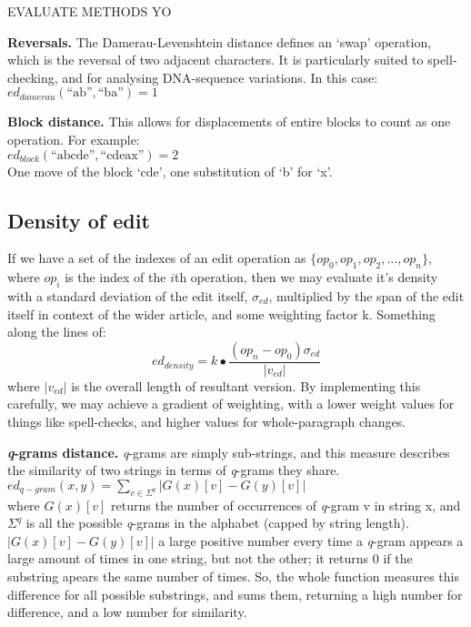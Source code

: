 EVALUATE METHODS YO \label{split-distance-eval}

\textbf{Reversals.} The Damerau-Levenshtein distance defines an `swap'
operation, which is the reversal of two adjacent characters. It is
particularly suited to spell-checking, and for analysing DNA-sequence
variations. In this case:\\ $ed_{damerau}(\text{``ab''},\text{``ba''})
= 1$

\textbf{Block distance.} This allows for displacements of entire
blocks to count as one operation. For
example:\\ $ed_{block}(\text{``abcde''},\text{``cdeax''})= 2$ \\ One
move of the block `cde', one substitution of `b' for
`x'.\cite{Tichy1984}

\subsection*{Density of edit}

If we have a set of the indexes of an edit operation as
$\{op_0,op_1,op_2,\dots, op_n\}$, where $op_i$ is the index of the
$i$th operation, then we may evaluate it's density with a standard
deviation of the edit itself, $\sigma_{ed}$, multiplied by the span of
the edit itself in context of the wider article, and some weighting
factor k. Something along the lines of:
$$ed_{density} = k\bullet\frac{(op_n - op_0)\sigma_{ed}}{|v_{ed}|}$$
where $|v_{ed}|$ is the overall length of resultant version. By
implementing this carefully, we may achieve a gradient of weighting,
with a lower weight values for things like spell-checks, and higher
values for whole-paragraph changes.

\textbf{\textit{q}-grams distance.} \textit{q}-grams are simply
sub-strings, and this measure describes the similarity of two strings
in terms of \textit{q}-grams they
share.\cite{Ukkonen1992}\\ $ed_{q-gram}(x,y)=\sum\limits_{v\in\Sigma
  ^q}|G(x)[v]-G(y)[v]|$\\ where $G(x)[v]$ returns the number of
occurrences of \textit{q}-gram v in string x, and $\Sigma ^q$ is all
the possible \textit{q}-grams in the alphabet (capped by string
length). $|G(x)[v]-G(y)[v]|$ a large positive number every time a
\textit{q}-gram appears a large amount of times in one string, but not
the other; it returns 0 if the substring apears the same number of
times. So, the whole function measures this difference for all
possible substrings, and sums them, returning a high number for
difference, and a low number for similarity.


